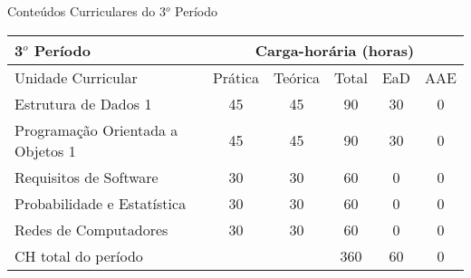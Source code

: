 \begin{quadro}[ht!]
\centering
\caption{Conteúdos Curriculares do 3$^o$ Período}\label{qua:periodo3}
\begin{tabular}{|p{5.0cm}|c|c|c|c|c|}
\hline
\rowcolor{blue1} 3$^o$ Período & \multicolumn{5}{|c|}{\centering Carga-horária (horas)} \\ \hline
\rowcolor{blue1} Unidade Curricular & Prática & Teórica & Total & EaD & AAE \\ \hline
Estrutura de Dados 1 & 45 & 45 & 90 & 30	&	0 \\	\hline
Programação Orientada a Objetos 1  & 45 & 45 & 90 & 30	&	0 \\	\hline
Requisitos de Software & 30 & 30 & 60 & 0	&	0 \\	\hline
Probabilidade e Estatística & 30 & 30 & 60 & 0	&	0 \\	\hline
Redes de Computadores & 30 & 30 & 60 & 0	&	0 \\	\hline
CH total do período & \multicolumn{2}{p{3.3cm}|}{\cellcolor{blue1}} & 360 & 60	&	0 \\ \hline
\end{tabular} \end{quadro}